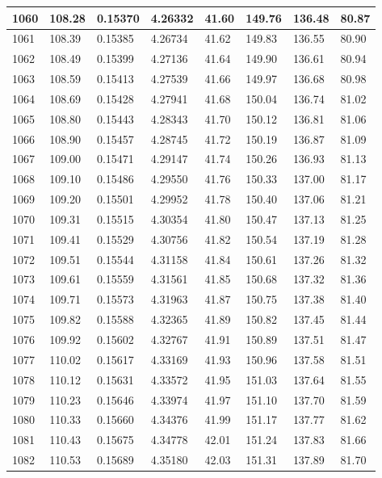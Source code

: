 \documentclass[12pt,a4paper,twoside]{article}
\begin{document}
\begin{center}
\begin{longtable}{l l l l | l l l l}
1060 & 108.28 & 0.15370 & 4.26332 & 41.60 & 149.76 & 136.48 & 80.87 \\ \hline
1061 & 108.39 & 0.15385 & 4.26734 & 41.62 & 149.83 & 136.55 & 80.90 \\ \hline
1062 & 108.49 & 0.15399 & 4.27136 & 41.64 & 149.90 & 136.61 & 80.94 \\ \hline
1063 & 108.59 & 0.15413 & 4.27539 & 41.66 & 149.97 & 136.68 & 80.98 \\ \hline
1064 & 108.69 & 0.15428 & 4.27941 & 41.68 & 150.04 & 136.74 & 81.02 \\ \hline
1065 & 108.80 & 0.15443 & 4.28343 & 41.70 & 150.12 & 136.81 & 81.06 \\ \hline
1066 & 108.90 & 0.15457 & 4.28745 & 41.72 & 150.19 & 136.87 & 81.09 \\ \hline
1067 & 109.00 & 0.15471 & 4.29147 & 41.74 & 150.26 & 136.93 & 81.13 \\ \hline
1068 & 109.10 & 0.15486 & 4.29550 & 41.76 & 150.33 & 137.00 & 81.17 \\ \hline
1069 & 109.20 & 0.15501 & 4.29952 & 41.78 & 150.40 & 137.06 & 81.21 \\ \hline
1070 & 109.31 & 0.15515 & 4.30354 & 41.80 & 150.47 & 137.13 & 81.25 \\ \hline
1071 & 109.41 & 0.15529 & 4.30756 & 41.82 & 150.54 & 137.19 & 81.28 \\ \hline
1072 & 109.51 & 0.15544 & 4.31158 & 41.84 & 150.61 & 137.26 & 81.32 \\ \hline
1073 & 109.61 & 0.15559 & 4.31561 & 41.85 & 150.68 & 137.32 & 81.36 \\ \hline
1074 & 109.71 & 0.15573 & 4.31963 & 41.87 & 150.75 & 137.38 & 81.40 \\ \hline
1075 & 109.82 & 0.15588 & 4.32365 & 41.89 & 150.82 & 137.45 & 81.44 \\ \hline
1076 & 109.92 & 0.15602 & 4.32767 & 41.91 & 150.89 & 137.51 & 81.47 \\ \hline
1077 & 110.02 & 0.15617 & 4.33169 & 41.93 & 150.96 & 137.58 & 81.51 \\ \hline
1078 & 110.12 & 0.15631 & 4.33572 & 41.95 & 151.03 & 137.64 & 81.55 \\ \hline
1079 & 110.23 & 0.15646 & 4.33974 & 41.97 & 151.10 & 137.70 & 81.59 \\ \hline
1080 & 110.33 & 0.15660 & 4.34376 & 41.99 & 151.17 & 137.77 & 81.62 \\ \hline
1081 & 110.43 & 0.15675 & 4.34778 & 42.01 & 151.24 & 137.83 & 81.66 \\ \hline
1082 & 110.53 & 0.15689 & 4.35180 & 42.03 & 151.31 & 137.89 & 81.70 \\ \hline

\end{longtable}
\end{center}
\end{document}

